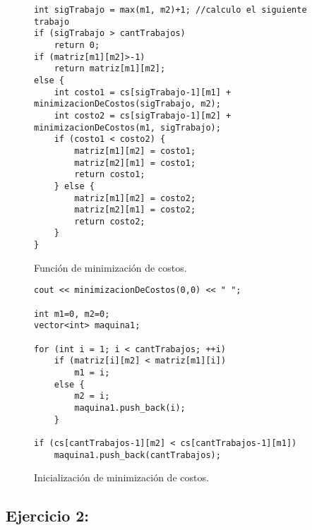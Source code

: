 \documentclass[10pt, a4paper]{article}
\begin{document}
\begin{figure}[H]
\begin{center}
\begin{verbatim}
int sigTrabajo = max(m1, m2)+1; //calculo el siguiente trabajo
if (sigTrabajo > cantTrabajos)
    return 0;
if (matriz[m1][m2]>-1)
    return matriz[m1][m2];
else {
    int costo1 = cs[sigTrabajo-1][m1] + minimizacionDeCostos(sigTrabajo, m2);
    int costo2 = cs[sigTrabajo-1][m2] + minimizacionDeCostos(m1, sigTrabajo);
    if (costo1 < costo2) {
        matriz[m1][m2] = costo1;
        matriz[m2][m1] = costo1;
        return costo1;
    } else {
        matriz[m1][m2] = costo2;
        matriz[m2][m1] = costo2;
        return costo2;
    }
}
\end{verbatim}
\caption{Función de minimización de costos.}

\begin{verbatim}
cout << minimizacionDeCostos(0,0) << " ";

int m1=0, m2=0;
vector<int> maquina1;

for (int i = 1; i < cantTrabajos; ++i)
    if (matriz[i][m2] < matriz[m1][i])
        m1 = i;
    else {
        m2 = i;
        maquina1.push_back(i);
    }

if (cs[cantTrabajos-1][m2] < cs[cantTrabajos-1][m1]) 
    maquina1.push_back(cantTrabajos);
\end{verbatim}
\caption{Inicialización de minimización de costos.}
\end{center}
\end{figure}

\subsection{Ejercicio 2:}
\end{document}
